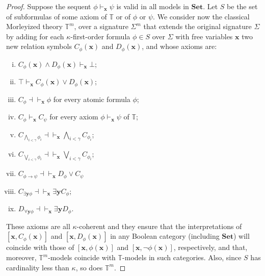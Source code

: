 \documentclass[a4paper,11pt]{article}
\theoremstyle{plain}
\theoremstyle{plain}
\theoremstyle{remark}
\newcommand{\alg}[1]{\ensuremath{\mathbf{#1}}}
\newcommand{\Sets}{\ensuremath{\mathbf{Set}}}
\newcommand{\theory}{\ensuremath{\mathbb{T}}}
\begin{document}
\begin{proof}
 Suppose the sequent $\phi \vdash_{\alg{x}} \psi$ is valid in all models in \Sets. Let $S$ be the set of subformulas of some axiom of $\theory$ or of $\phi$ or $\psi$. We consider now the classical Morleyized theory $\theory^m$, over a signature $\Sigma^m$ that extends the original signature $\Sigma$ by adding for each $\kappa$-first-order formula $\phi \in S$ over $\Sigma$ with free variables \alg{x} two new relation symbols $C_{\phi}(\alg{x})$ and $D_{\phi}(\alg{x})$, and whose axioms are:

\begin{enumerate}[(i)]

\item $C_{\phi}(\alg{x}) \wedge D_{\phi}(\alg{x}) \vdash_{\alg{x}} \bot$;
\item $\top \vdash_{\alg{x}} C_{\phi}(\alg{x}) \vee D_{\phi}(\alg{x})$;
\item $C_{\phi}\dashv\vdash_{\alg{x}}\phi$ for every atomic formula $\phi$;
\item $C_{\phi}\vdash_{\alg{x}}C_{\psi}$ for every axiom $\phi\vdash_{\alg{x}}{\psi}$ of \theory;
\item $C_{\bigwedge_{i<\gamma}\phi_i}\dashv\vdash_{\alg{x}}\bigwedge_{i<\gamma}C_{\phi_i}$;
\item $C_{\bigvee_{i<\gamma}\phi_i}\dashv\vdash_{\alg{x}}\bigvee_{i<\gamma}C_{\phi_i}$;
\item $C_{\phi \rightarrow \psi}\dashv\vdash_{\alg{x}}D_{\phi} \vee C_{\psi}$
\item $C_{\exists{\mathbf{y}}\phi}\dashv\vdash_{\alg{x}}\exists{\mathbf{y}}C_{\phi}$;
\item $D_{\forall{\mathbf{y}}\phi}\dashv\vdash_{\alg{x}}\exists{\mathbf{y}}D_{\phi}$.

\end{enumerate} 

These axioms are all $\kappa$-coherent and they ensure that the interpretations of $[\alg{x}, C_{\phi}(\alg{x})]$ and $[\alg{x}, D_{\phi}(\alg{x})]$ in any Boolean category (including \Sets) will coincide with those of $[\alg{x}, \phi(\alg{x})]$ and $[\alg{x}, \neg \phi(\alg{x})]$, respectively, and that, moreover, $\theory^m$-models coincide with $\theory$-models in such categories. Also, since $S$ has cardinality less than $\kappa$, so does $\theory^m$. 


\end{proof}
\end{document}
